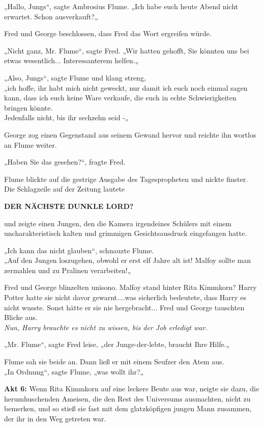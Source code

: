 {„Hallo, Jungs“, sagte Ambrosius Flume. „Ich habe euch heute Abend nicht erwartet. Schon ausverkauft?„

Fred und George beschlossen, dass Fred das Wort ergreifen würde.

„Nicht ganz, Mr. Flume“, sagte Fred. „Wir hatten gehofft, Sie könnten uns bei etwas wesentlich... Interessanterem helfen.„

„Also, Jungs“, sagte Flume und klang streng,\\ „ich hoffe, ihr habt mich nicht geweckt, nur damit ich euch noch einmal sagen kann, dass ich euch keine Ware verkaufe, die euch in echte Schwierigkeiten bringen könnte.\\ Jedenfalls nicht, bis ihr sechzehn seid -„

George zog einen Gegenstand aus seinem Gewand hervor und reichte ihn wortlos an Flume weiter.

„Haben Sie das gesehen?“, fragte Fred.

Flume blickte auf die gestrige Ausgabe des Tagespropheten und nickte finster.\\ Die Schlagzeile auf der Zeitung lautete

\textbf{DER NÄCHSTE DUNKLE LORD?}

und zeigte einen Jungen, den die Kamera irgendeines Schülers mit einem uncharakteristisch kalten und grimmigen Gesichtsausdruck eingefangen hatte.

„Ich kann das nicht glauben“, schnauzte Flume.\\ „Auf den Jungen loszugehen, obwohl er erst elf Jahre alt ist! Malfoy sollte man zermahlen und zu Pralinen verarbeiten!„

Fred und George blinzelten unisono. Malfoy stand hinter Rita Kimmkorn? Harry Potter hatte sie nicht davor gewarnt....was sicherlich bedeutete, dass Harry es nicht wusste. Sonst hätte er sie nie hergebracht... Fred und George tauschten Blicke aus.\\ \emph{Nun, Harry brauchte es nicht zu wissen, bis der Job erledigt war.}

„Mr. Flume“, sagte Fred leise, „der Junge-der-lebte, braucht Ihre Hilfe.„

Flume sah sie beide an. Dann ließ er mit einem Seufzer den Atem aus.\\ „In Ordnung“, sagte Flume, „was wollt ihr?„

\textbf{Akt 6:} Wenn Rita Kimmkorn auf eine leckere Beute aus war, neigte sie dazu, die herumhuschenden Ameisen, die den Rest des Universums ausmachten, nicht zu bemerken, und so stieß sie fast mit dem glatzköpfigen jungen Mann zusammen, der ihr in den Weg getreten war.

}
